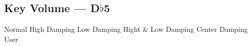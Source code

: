 \subsection[Key Volume]{Key Volume --- \UiKey{\I}\UiKey{\SET}D$\flat$5}









































Normal
High Damping
Low Damping
Hight \& Low Damping
Center Damping
User
